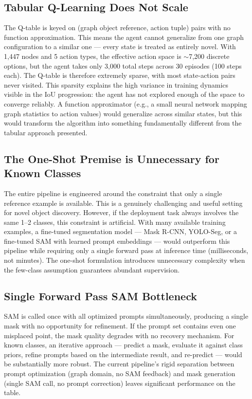 \documentclass[11pt]{article}
\begin{document}
\subsection{Tabular Q-Learning Does Not Scale}

The Q-table is keyed on (graph object reference, action tuple) pairs with no function approximation. This means the agent cannot generalize from one graph configuration to a similar one --- every state is treated as entirely novel. With 1,447 nodes and 5 action types, the effective action space is $\sim$7,200 discrete options, but the agent takes only 3,000 total steps across 30 episodes (100 steps each). The Q-table is therefore extremely sparse, with most state-action pairs never visited. This sparsity explains the high variance in training dynamics visible in the IoU progression: the agent has not explored enough of the space to converge reliably. A function approximator (e.g., a small neural network mapping graph statistics to action values) would generalize across similar states, but this would transform the algorithm into something fundamentally different from the tabular approach presented.

\subsection{The One-Shot Premise is Unnecessary for Known Classes}

The entire pipeline is engineered around the constraint that only a single reference example is available. This is a genuinely challenging and useful setting for novel object discovery. However, if the deployment task always involves the same 1--2 classes, this constraint is artificial. With many available training examples, a fine-tuned segmentation model --- Mask R-CNN, YOLO-Seg, or a fine-tuned SAM with learned prompt embeddings --- would outperform this pipeline while requiring only a single forward pass at inference time (milliseconds, not minutes). The one-shot formulation introduces unnecessary complexity when the few-class assumption guarantees abundant supervision.

\subsection{Single Forward Pass SAM Bottleneck}

SAM is called once with all optimized prompts simultaneously, producing a single mask with no opportunity for refinement. If the prompt set contains even one misplaced point, the mask quality degrades with no recovery mechanism. For known classes, an iterative approach --- predict a mask, evaluate it against class priors, refine prompts based on the intermediate result, and re-predict --- would be substantially more robust. The current pipeline's rigid separation between prompt optimization (graph domain, no SAM feedback) and mask generation (single SAM call, no prompt correction) leaves significant performance on the table.
\end{document}
